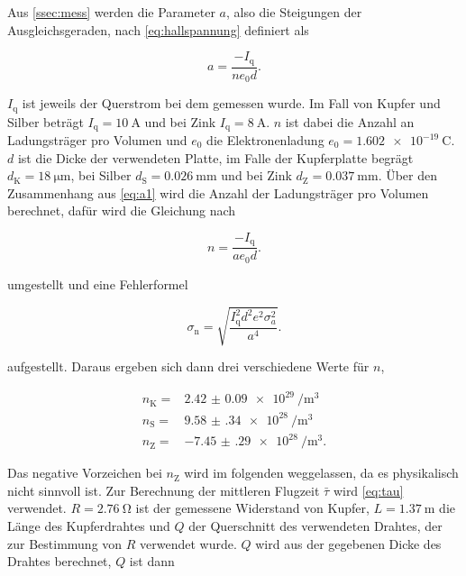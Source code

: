 Aus \autoref{ssec:mess} werden die Parameter $a$, also die Steigungen der Ausgleichsgeraden, nach \autoref{eq:hallspannung} definiert als

\begin{equation}
    a = \frac{-I_\text{q}}{n e_0 d}.
    \label{eq:a1}
\end{equation}

$I_\text{q}$ ist jeweils der Querstrom bei dem gemessen wurde.
Im Fall von Kupfer und Silber beträgt $I_\text{q} = \SI{10}{\ampere}$ und bei Zink $I_\text{q} = \SI{8}{\ampere}$.
$n$ ist dabei die Anzahl an Ladungsträger pro Volumen und $e_0$ die Elektronenladung $e_0 = \SI{1.602e-19}{\coulomb}$. 
$d$ ist die Dicke der verwendeten Platte, im Falle der Kupferplatte begrägt $d_\text{K} = \SI{18}{\micro\meter}$, bei Silber $d_\text{S} = \SI{0.026}{\milli\meter}$ und bei Zink $d_\text{Z} = \SI{0.037}{\milli\meter}$.
Über den Zusammenhang aus \autoref{eq:a1} wird die Anzahl der Ladungsträger pro Volumen berechnet, dafür wird die Gleichung nach 

\begin{equation}
    n = \frac{-I_\text{q}}{a e_0 d}.
    \label{eq:n}
\end{equation}

umgestellt und eine Fehlerformel 

\begin{equation}
    \sigma _\text{n} = \sqrt{\frac {I_\text{q}^{2} d^{2} e^{2} \sigma_{a}^{2} }{a^{4}}}.
    \label{eq:n_fehler}
\end{equation}

aufgestellt.
Daraus ergeben sich dann drei verschiedene Werte für $n$,

\begin{align}
    n_\text{K} =& \SI{2.42(9)e29}{\per\cubic\meter} \\
    n_\text{S} =& \SI{9.58(34)e28}{\per\cubic\meter} \\
    n_\text{Z} =& \SI{-7.45(29)e28}{\per\cubic\meter}.
    \label{eq:n1}
\end{align}

Das negative Vorzeichen bei $n_\text{Z}$ wird im folgenden weggelassen, da es physikalisch nicht sinnvoll ist.
Zur Berechnung der mittleren Flugzeit $\bar{\tau}$ wird \autoref{eq:tau} verwendet.
$R = \SI{2.76}{\ohm}$ ist der gemessene Widerstand von Kupfer, $L = \SI{1.37}{\meter}$ die Länge des Kupferdrahtes und $Q$ der Querschnitt des verwendeten Drahtes, der zur Bestimmung von $R$ verwendet wurde.
$Q$ wird aus der gegebenen Dicke des Drahtes berechnet, $Q$ ist dann

